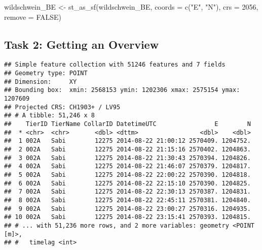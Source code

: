 \documentclass[
]{article}
\newenvironment{Shaded}{\begin{snugshade}}{\end{snugshade}}
\newcommand{\AttributeTok}[1]{\textcolor[rgb]{0.77,0.63,0.00}{#1}}
\newcommand{\ConstantTok}[1]{\textcolor[rgb]{0.00,0.00,0.00}{#1}}
\newcommand{\DecValTok}[1]{\textcolor[rgb]{0.00,0.00,0.81}{#1}}
\newcommand{\FunctionTok}[1]{\textcolor[rgb]{0.00,0.00,0.00}{#1}}
\newcommand{\NormalTok}[1]{#1}
\newcommand{\OtherTok}[1]{\textcolor[rgb]{0.56,0.35,0.01}{#1}}
\newcommand{\SpecialCharTok}[1]{\textcolor[rgb]{0.00,0.00,0.00}{#1}}
\newcommand{\StringTok}[1]{\textcolor[rgb]{0.31,0.60,0.02}{#1}}
\begin{document}
\begin{Shaded}
\begin{Highlighting}[]
\NormalTok{wildschwein\_BE }\OtherTok{\textless{}{-}} \FunctionTok{st\_as\_sf}\NormalTok{(wildschwein\_BE, }\AttributeTok{coords =} \FunctionTok{c}\NormalTok{(}\StringTok{"E"}\NormalTok{, }\StringTok{"N"}\NormalTok{), }\AttributeTok{crs =} \DecValTok{2056}\NormalTok{, }\AttributeTok{remove =} \ConstantTok{FALSE}\NormalTok{)}
\end{Highlighting}
\end{Shaded}

\hypertarget{task-2-getting-an-overview}{%
\subsection{Task 2: Getting an
Overview}\label{task-2-getting-an-overview}}

\begin{Shaded}
\end{Shaded}

\begin{verbatim}
## Simple feature collection with 51246 features and 7 fields
## Geometry type: POINT
## Dimension:     XY
## Bounding box:  xmin: 2568153 ymin: 1202306 xmax: 2575154 ymax: 1207609
## Projected CRS: CH1903+ / LV95
## # A tibble: 51,246 x 8
##    TierID TierName CollarID DatetimeUTC                E        N
##  * <chr>  <chr>       <dbl> <dttm>                 <dbl>    <dbl>
##  1 002A   Sabi        12275 2014-08-22 21:00:12 2570409. 1204752.
##  2 002A   Sabi        12275 2014-08-22 21:15:16 2570402. 1204863.
##  3 002A   Sabi        12275 2014-08-22 21:30:43 2570394. 1204826.
##  4 002A   Sabi        12275 2014-08-22 21:46:07 2570379. 1204817.
##  5 002A   Sabi        12275 2014-08-22 22:00:22 2570390. 1204818.
##  6 002A   Sabi        12275 2014-08-22 22:15:10 2570390. 1204825.
##  7 002A   Sabi        12275 2014-08-22 22:30:13 2570387. 1204831.
##  8 002A   Sabi        12275 2014-08-22 22:45:11 2570381. 1204840.
##  9 002A   Sabi        12275 2014-08-22 23:00:27 2570316. 1204935.
## 10 002A   Sabi        12275 2014-08-22 23:15:41 2570393. 1204815.
## # ... with 51,236 more rows, and 2 more variables: geometry <POINT [m]>,
## #   timelag <int>
\end{verbatim}
\end{document}
